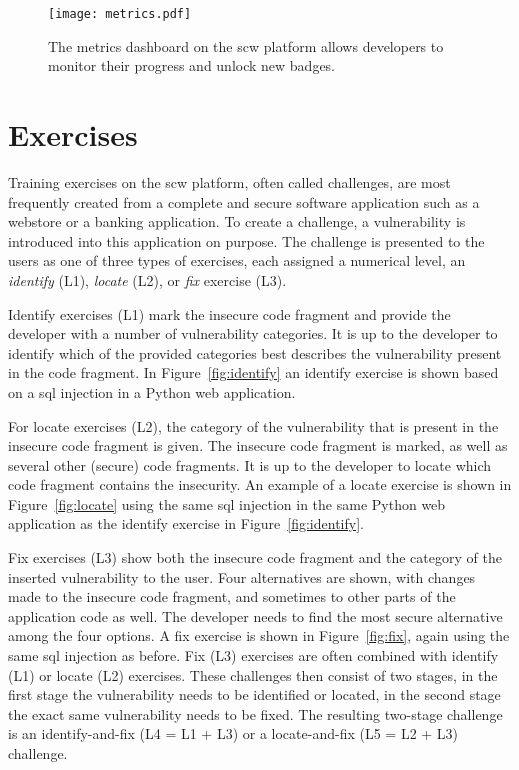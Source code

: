 \begin{sidewaysfigure}
  \centering
  \texttt{[image: metrics.pdf]}
  \caption[SCW metrics dashboard]{The metrics dashboard on the \gls{scw} platform allows developers to monitor their progress and unlock new badges.}
  \label{fig:metrics} 
\end{sidewaysfigure}

\section{Exercises}
\label{sec:challenges}
Training exercises on the \gls{scw} platform, often called challenges, are most frequently created from a complete and secure software application such as a webstore or a banking application. To create a challenge, a \gls{vulnerability} is introduced into this application on purpose.
The challenge is presented to the users as one of three types of exercises, each assigned a numerical level, an \textit{identify} (L1), \textit{locate} (L2), or \textit{fix} exercise (L3).

Identify exercises (L1) mark the insecure code fragment and provide the developer with a number of \gls{vulnerability} categories. It is up to the developer to identify which of the provided categories best describes the vulnerability present in the code fragment. In Figure~\ref{fig:identify} an identify exercise is shown based on a \gls{sql} injection in a Python web application.

For locate exercises (L2), the category of the vulnerability that is present in the insecure code fragment is given.
The insecure code fragment is marked, as well as several other (secure) code fragments. 
It is up to the developer to locate which code fragment contains the insecurity.
An example of a locate exercise is shown in Figure~\ref{fig:locate} using the same \gls{sql} injection in the same Python web application as the identify exercise in Figure~\ref{fig:identify}.

Fix exercises (L3) show both the insecure code fragment and the category of the inserted vulnerability to the user. 
Four alternatives are shown, with changes made to the insecure code fragment, and sometimes to other parts of the application code as well.
The developer needs to find the most secure alternative among the four options.
A fix exercise is shown in Figure~\ref{fig:fix}, again using the same \gls{sql} injection as before. 
Fix (L3) exercises are often combined with identify (L1) or locate (L2) exercises. 
These challenges then consist of two stages, in the first stage the vulnerability needs to be identified or located, in the second stage the exact same vulnerability needs to be fixed. 
The resulting two-stage challenge is an identify-and-fix (L4 = L1 + L3) or a locate-and-fix (L5 = L2 + L3) challenge.

